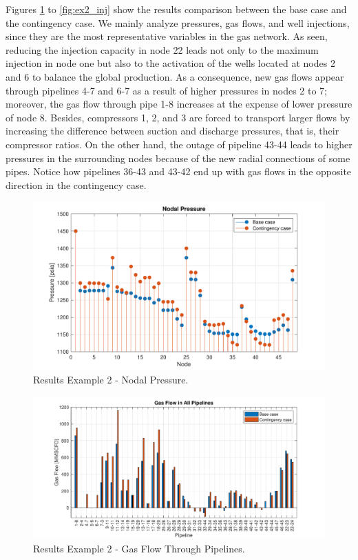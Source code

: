 Figures \ref{fig:ex2_pressure} to \ref{fig:ex2_inj} show the results comparison between the base case and the contingency case. We mainly analyze pressures, gas flows, and well injections, since they are the most representative variables in the gas network. As seen, reducing the injection capacity in node 22 leads not only to the maximum injection in node one but also to the activation of the wells located at nodes 2 and 6 to balance the global production. As a consequence, new gas flows appear through pipelines 4-7 and 6-7 as a result of higher pressures in nodes 2 to 7; moreover, the gas flow through pipe 1-8 increases at the expense of lower pressure of node 8. Besides, compressors 1, 2, and 3 are forced to transport larger flows by increasing the difference between suction and discharge pressures, that is, their compressor ratios. On the other hand, the outage of pipeline 43-44 leads to higher pressures in the surrounding nodes because of the new radial connections of some pipes. Notice how pipelines 36-43 and 43-42 end up with gas flows in the opposite direction in the contingency case.

\begin{figure}[H]
\centering	
\includegraphics[scale=0.8]{Figures/ex2_pressure}
\caption{Results Example 2 - Nodal Pressure.}
\label{fig:ex2_pressure}
\end{figure}

\begin{figure}[H]
\includegraphics[scale=0.75]{Figures/ex2_fgo}
\caption{Results Example 2 - Gas Flow Through Pipelines.}
\label{fig:ex2_fgo}
\end{figure}

